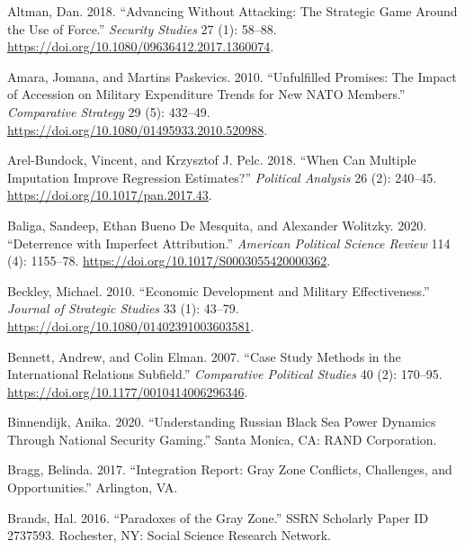 \documentclass[
]{article}
\begin{document}
\hypertarget{refs}{}
\leavevmode\hypertarget{ref-altman_advancingattackingstrategic_2018}{}%
Altman, Dan. 2018. ``Advancing Without Attacking: The Strategic Game Around the Use of Force.'' \emph{Security Studies} 27 (1): 58--88. \url{https://doi.org/10.1080/09636412.2017.1360074}.

\leavevmode\hypertarget{ref-amara_unfulfilledpromisesimpact_2010}{}%
Amara, Jomana, and Martins Paskevics. 2010. ``Unfulfilled Promises: The Impact of Accession on Military Expenditure Trends for New NATO Members.'' \emph{Comparative Strategy} 29 (5): 432--49. \url{https://doi.org/10.1080/01495933.2010.520988}.

\leavevmode\hypertarget{ref-arel-bundock_whencanmultiple_2018}{}%
Arel-Bundock, Vincent, and Krzysztof J. Pelc. 2018. ``When Can Multiple Imputation Improve Regression Estimates?'' \emph{Political Analysis} 26 (2): 240--45. \url{https://doi.org/10.1017/pan.2017.43}.

\leavevmode\hypertarget{ref-baliga_deterrenceimperfectattribution_2020}{}%
Baliga, Sandeep, Ethan Bueno De Mesquita, and Alexander Wolitzky. 2020. ``Deterrence with Imperfect Attribution.'' \emph{American Political Science Review} 114 (4): 1155--78. \url{https://doi.org/10.1017/S0003055420000362}.

\leavevmode\hypertarget{ref-beckley_economicdevelopmentmilitary_2010}{}%
Beckley, Michael. 2010. ``Economic Development and Military Effectiveness.'' \emph{Journal of Strategic Studies} 33 (1): 43--79. \url{https://doi.org/10.1080/01402391003603581}.

\leavevmode\hypertarget{ref-bennett_casestudymethods_2007}{}%
Bennett, Andrew, and Colin Elman. 2007. ``Case Study Methods in the International Relations Subfield.'' \emph{Comparative Political Studies} 40 (2): 170--95. \url{https://doi.org/10.1177/0010414006296346}.

\leavevmode\hypertarget{ref-binnendijk_understandingrussianblack_2020}{}%
Binnendijk, Anika. 2020. ``Understanding Russian Black Sea Power Dynamics Through National Security Gaming.'' Santa Monica, CA: RAND Corporation.

\leavevmode\hypertarget{ref-bragg_integrationreportgray_2017}{}%
Bragg, Belinda. 2017. ``Integration Report: Gray Zone Conflicts, Challenges, and Opportunities.'' Arlington, VA.

\leavevmode\hypertarget{ref-brands_paradoxesgrayzone_2016}{}%
Brands, Hal. 2016. ``Paradoxes of the Gray Zone.'' SSRN Scholarly Paper ID 2737593. Rochester, NY: Social Science Research Network.
\end{document}
